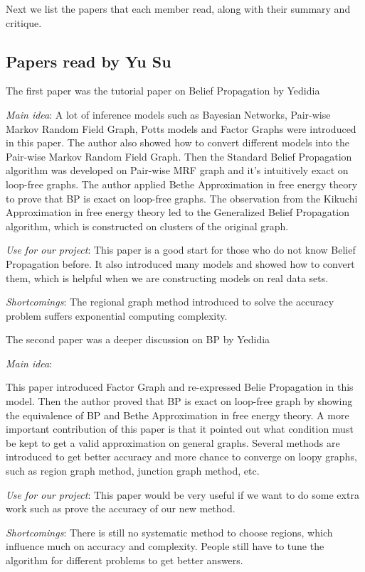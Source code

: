Next we list the papers that each member read,
along with their summary and critique.

\subsection{Papers read by Yu Su}
The first paper was the tutorial paper on Belief Propagation by Yedidia
\cite{Yedidia:2003:UBP}
\begin{itemize*}
\item {\em Main idea}:
A lot of inference models such as Bayesian Networks, Pair-wise Markov Random Field Graph, Potts models and Factor Graphs were introduced in this paper.
The author also showed how to convert different models into the Pair-wise Markov Random Field Graph.
Then the Standard Belief Propagation algorithm was developed on Pair-wise MRF graph and it's intuitively exact on loop-free graphs.
The author applied Bethe Approximation in free energy theory to prove that BP is exact on loop-free graphs.
The observation from the Kikuchi Approximation in free energy theory led to the Generalized Belief Propagation algorithm, which is constructed on clusters of the original graph.

\item {\em Use for our project}:
This paper is a good start for those who do not know Belief Propagation before. It also introduced many models and showed how to convert them, which is helpful when we are constructing models on real data sets.

\item {\em Shortcomings}:
The regional graph method introduced to solve the accuracy problem suffers exponential computing complexity.

\end{itemize*}


The second paper was a deeper discussion on BP by Yedidia
\cite{Yedidia05constructingfree}
\begin{itemize*}
\item {\em Main idea}:

This paper introduced Factor Graph and re-expressed Belie Propagation in this model.
Then the author proved that BP is exact on loop-free graph by showing the equivalence of BP and Bethe Approximation in free energy theory.
A more important contribution of this paper is that it pointed out what condition must be kept to get a valid approximation on general graphs.
Several methods are introduced to get better accuracy and more chance to converge on loopy graphs, such as region graph method, junction graph method, etc.

\item {\em Use for our project}:
This paper would be very useful if we want to do some extra work such as prove the accuracy of our new method.

\item {\em Shortcomings}:
There is still no systematic method to choose regions, which influence much on accuracy and complexity. People still have to tune the algorithm for different problems to get better answers.

\end{itemize*}


